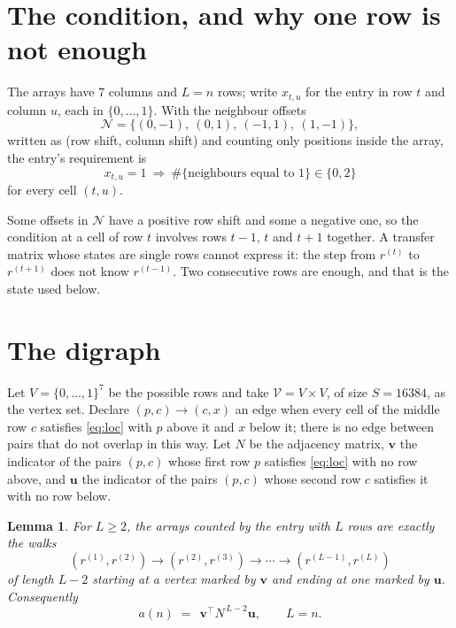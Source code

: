 \documentclass[11pt,a4paper]{article}
\theoremstyle{plain}
\newtheorem{lemma}[theorem]{Lemma}
\theoremstyle{definition}
\begin{document}
\section{The condition, and why one row is not enough}

The arrays have $7$ columns and $L=n$ rows; write $x_{t,u}$ for the entry in
row $t$ and column $u$, each in $\{0,\dots,1\}$. With the neighbour offsets
\[
\mathcal N=\{(0,-1),\ (0,1),\ (-1,1),\ (1,-1)\},
\]
written as (row shift, column shift) and counting only positions inside the array, the
entry's requirement is
\begin{equation}\label{eq:loc}
x_{t,u}=1\ \Rightarrow\ \#\{\text{neighbours equal to }1\}\in\{0,2\}
\end{equation}
for every cell $(t,u)$.

Some offsets in $\mathcal N$ have a positive row shift and some a negative one, so the
condition at a cell of row $t$ involves rows $t-1$, $t$ and $t+1$ together. A transfer
matrix whose states are single rows cannot express it: the step from $r^{(t)}$ to
$r^{(t+1)}$ does not know $r^{(t-1)}$. Two consecutive rows are enough, and that is
the state used below.

\section{The digraph}

Let $V=\{0,\dots,1\}^{7}$ be the possible rows and take
$\mathcal V=V\times V$, of size $S=16384$, as the vertex set. Declare $(p,c)\to(c,x)$ an edge
when every cell of the middle row $c$ satisfies \eqref{eq:loc} with $p$ above it and $x$
below it; there is no edge between pairs that do not overlap in this way. Let $N$ be the
adjacency matrix, $\mathbf{v}$ the indicator of the pairs $(p,c)$ whose first row $p$
satisfies \eqref{eq:loc} with no row above, and $\mathbf{u}$ the indicator of
the pairs $(p,c)$ whose second row $c$ satisfies it with no row below.

\begin{lemma}\label{lem:walk}
For $L\ge2$, the arrays counted by the entry with $L$ rows are exactly the walks
\[
(r^{(1)},r^{(2)})\to(r^{(2)},r^{(3)})\to\cdots\to(r^{(L-1)},r^{(L)})
\]
of length $L-2$ starting at a vertex marked by $\mathbf{v}$ and ending at one marked by
$\mathbf{u}$. Consequently
\[
a(n)\;=\;\,\mathbf{v}^{\!\top}N^{\,L-2}\mathbf{u},\qquad L=n .
\]
\end{lemma}
\end{document}

